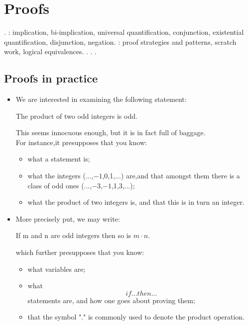 \documentclass[a4paper]{article}
\begin{document}
\tableofcontents

\section{Proofs}

. : implication, bi-implication, universal quantiﬁcation, conjunction, existential quantiﬁcation, disjunction, negation. : proof strategies and patterns, scratch work, logical equivalences. . . . 

\subsection{Proofs in practice}

\begin{itemize}
\item[]
We are interested in examining the following statement:\\
\begin{stat}
The product of two odd integers is odd.\\
\end{stat}
This seems innocuous enough, but it is in fact full of baggage.\\
For instance,it presupposes that you know:
\begin{itemize}

\item what a statement is;
\item what the integers (...,$-1$,0,1,...) are,and that amongst them there is a class of odd ones (...,$-3$,$-1$,1,3,...);
\item what the product of two integers is, and that this is in turn an integer.

\end{itemize}

\item[]
More precisely put, we may write:
\begin{stat}
If m and n are odd integers then so is $m\cdot n$.
\end{stat}
which further presupposes that you know:
\begin{itemize}
\item what variables are;
\item what $$if ... then ...$$ statements are, and how one goes about proving them;
\item that the symbol "." is commonly used to denote the product operation. 
\end{itemize}


\end{itemize}
\end{document}
